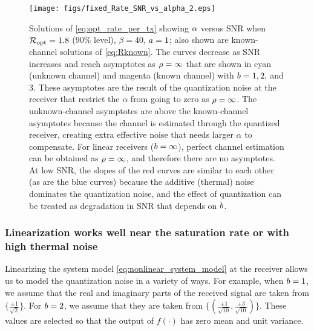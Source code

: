\documentclass[12pt, draftclsnofoot,journal,onecolumn]{IEEEtran}
\begin{document}
\begin{figure}
\texttt{[image: figs/fixed\_Rate\_SNR\_vs\_alpha\_2.eps]}
\centering
    \caption{Solutions of \eqref{eq:opt_rate_per_tx} showing $\alpha$ versus SNR when $\mathcal{R}_{\rm opt}=1.8$ (90\% level), $\beta=40$, $a=1$; also shown are known-channel solutions of \eqref{eq:Rknown}.  The curves decrease as SNR increases and reach asymptotes as $\rho=\infty$ that are shown in cyan (unknown channel) and magenta (known channel) with $b=1,2,$ and 3.  These asymptotes are the result of the quantization noise at the receiver that restrict the $\alpha$ from going to zero as $\rho=\infty$.  The unknown-channel asymptotes are above the known-channel asymptotes because the channel is estimated through the quantized receiver, creating extra effective noise that needs larger $\alpha$ to compensate.  For linear receivers ($b=\infty$), perfect channel estimation can be obtained as $\rho=\infty$, and therefore there are no asymptotes.  At low SNR, the slopes of the red curves are similar to each other (as are the blue curves) because the additive (thermal) noise dominates the quantization noise, and the effect of quantization can be treated as degradation in SNR that depends on $b$.
    }
    \label{fig:fixed_tau_opt_SNR_vs_alpha_2}
\end{figure}


\subsubsection{Linearization works well near the saturation rate or with high thermal noise}

Linearizing the system model \eqref{eq:nonlinear_system_model} at the receiver allows us to model the quantization noise in a variety of ways. 
For example, when $b=1$, we assume that the real and imaginary parts of the received signal are taken from $\{\frac{\pm 1}{\sqrt{2}}\}$.  For $b=2$, we assume that they are taken from $\{(\frac{\pm 1}{\sqrt{10}},\frac{\pm 3}{\sqrt{10}})\}$. These values are selected so that the output of $f(\cdot)$ has zero mean and unit variance.
\end{document}
